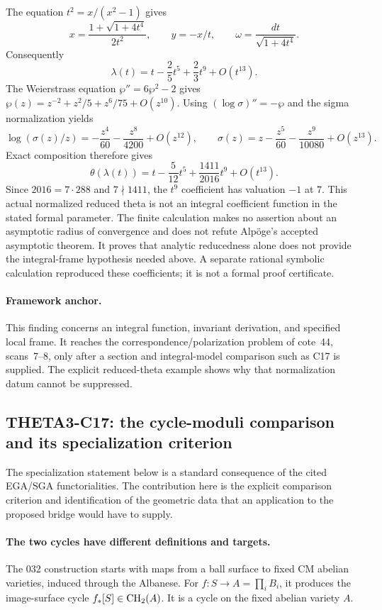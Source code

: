 The equation $t^2=x/(x^2-1)$ gives
\[
 x=\frac{1+\sqrt{1+4t^4}}{2t^2},\qquad y=-x/t,
 \qquad \omega=\frac{dt}{\sqrt{1+4t^4}}.
\]
Consequently
\[
 \lambda(t)=t-\frac25t^5+\frac23t^9+O(t^{13}).
\]
The Weierstrass equation $\wp''=6\wp^2-2$ gives
$\wp(z)=z^{-2}+z^2/5+z^6/75+O(z^{10})$.
Using $(\log\sigma)''=-\wp$ and the sigma normalization yields
\[
 \log(\sigma(z)/z)=-\frac{z^4}{60}-\frac{z^8}{4200}+O(z^{12}),
 \qquad
 \sigma(z)=z-\frac{z^5}{60}-\frac{z^9}{10080}+O(z^{13}).
\]
Exact composition therefore gives
\[
 \theta(\lambda(t))
 =t-\frac5{12}t^5+\frac{1411}{2016}t^9+O(t^{13}).
\]
Since $2016=7\cdot288$ and $7\nmid1411$, the $t^9$ coefficient
has valuation $-1$ at $7$. This actual normalized reduced theta is
not an integral coefficient function in the stated formal
parameter. The finite calculation makes no assertion about an
asymptotic radius of convergence and does not refute Alp\"oge's
accepted asymptotic theorem. It proves that analytic reducedness
alone does not provide the integral-frame hypothesis needed above.
A separate rational symbolic calculation reproduced these
coefficients; it is not a formal proof certificate.

\paragraph{Framework anchor.}
This finding concerns an integral function, invariant derivation, and
specified local frame.  It reaches the correspondence/polarization
problem of cote~44, scans~7--8, only after a section and integral-model
comparison such as C17 is supplied.  The explicit reduced-theta example
shows why that normalization datum cannot be suppressed.

\subsection{THETA3-C17: the cycle-moduli comparison and its specialization criterion}
\label{C17}

The specialization statement below is a standard consequence of the cited
EGA/SGA functorialities.  The contribution here is the explicit comparison
criterion and identification of the geometric data that an application
to the proposed bridge would have to supply.

\paragraph{The two cycles have different definitions and targets.}
The 032 construction starts with maps from a ball surface to fixed
CM abelian varieties, induced through the Albanese. For
$f:S\to A=\prod_iB_i$, it produces the image-surface cycle
$f_*[S]\in\operatorname{CH}_2(A)$. It is a cycle on the fixed abelian variety
$A$.

